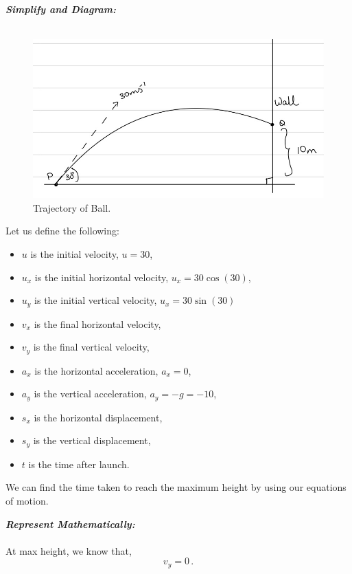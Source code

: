 \begin{subquestions}
\textbf{\textit{Simplify and Diagram:}} \\ \\ 
\begin{figure}[H]
	\begin{center}
		\includegraphics[scale=0.25]{../2005/figures/2005q6-1}
		\caption{\label{2005:q6:Diagram1} Trajectory of Ball.}
	\end{center}
\end{figure}
Let us define the following:
\begin{itemize}
	\item $u$ is the initial velocity, $u=30$,
	\item $u_x$ is the initial horizontal velocity, $u_x = 30\cos(30)$,
	\item $u_y$ is the initial vertical velocity, $u_x = 30\sin(30)$
	\item $v_x$ is the final horizontal velocity,
	\item $v_y$ is the final vertical velocity,
	\item $a_x$ is the horizontal acceleration, $a_x=0$,
	\item $a_y$ is the vertical acceleration, $a_y=-g=-10$,
	\item $s_x$ is the horizontal displacement,
	\item $s_y$ is the vertical displacement,
	\item $t$ is the time after launch.
\end{itemize}
We can find the time taken to reach the maximum height by using our equations of motion.
	
	
	
	
\textbf{\textit{Represent Mathematically:}} \\ \\
At max height, we know that,
\begin{equation}
	v_y = 0 \,.
\end{equation}


\end{subquestions}
